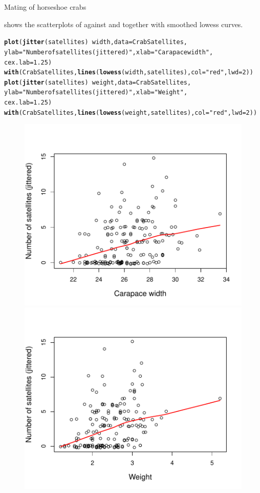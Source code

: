 \documentclass[11pt]{book}\usepackage[]{graphicx}\usepackage[]{color}
\makeatletter
\newcommand{\hlnum}[1]{\textcolor[rgb]{0.686,0.059,0.569}{#1}}%
\newcommand{\hlstr}[1]{\textcolor[rgb]{0.192,0.494,0.8}{#1}}%
\newcommand{\hlopt}[1]{\textcolor[rgb]{0,0,0}{#1}}%
\newcommand{\hlstd}[1]{\textcolor[rgb]{0.345,0.345,0.345}{#1}}%
\newcommand{\hlkwc}[1]{\textcolor[rgb]{0.333,0.667,0.333}{#1}}%
\newcommand{\hlkwd}[1]{\textcolor[rgb]{0.737,0.353,0.396}{\textbf{#1}}}%
\newenvironment{kframe}{%
 \def\at@end@of@kframe{}%
 \ifinner\ifhmode%
  \def\at@end@of@kframe{\end{minipage}}%
  \begin{minipage}{\columnwidth}%
 \fi\fi%
 \def\FrameCommand##1{\hskip\@totalleftmargin \hskip-\fboxsep
 \colorbox{shadecolor}{##1}\hskip-\fboxsep
     \hskip-\linewidth \hskip-\@totalleftmargin \hskip\columnwidth}%
 \MakeFramed {\advance\hsize-\width
   \@totalleftmargin\z@ \linewidth\hsize
   \@setminipage}}%
 {\par\unskip\endMakeFramed%
 \at@end@of@kframe}
\newenvironment{knitrout}{}{} %
\renewenvironment{knitrout}{\small\renewcommand{\baselinestretch}{.85}}{} %
\makeatother
\begin{document}
\begin{Example}[crabs1]{Mating of horseshoe crabs}
\begin{knitrout}
\end{knitrout}

 shows the scatterplots of  against  and 
together with smoothed lowess curves.
\begin{knitrout}
\color{fgcolor}\begin{kframe}
\begin{alltt}
\hlkwd{plot}\hlstd{(}\hlkwd{jitter}\hlstd{(satellites)} \hlopt{~} \hlstd{width,} \hlkwc{data}\hlstd{=CrabSatellites,}
  \hlkwc{ylab}\hlstd{=}\hlstr{"Number of satellites (jittered)"}\hlstd{,} \hlkwc{xlab}\hlstd{=}\hlstr{"Carapace width"}\hlstd{,}
  \hlkwc{cex.lab}\hlstd{=}\hlnum{1.25}\hlstd{)}
\hlkwd{with}\hlstd{(CrabSatellites,} \hlkwd{lines}\hlstd{(}\hlkwd{lowess}\hlstd{(width, satellites),} \hlkwc{col}\hlstd{=}\hlstr{"red"}\hlstd{,} \hlkwc{lwd}\hlstd{=}\hlnum{2}\hlstd{))}
\hlkwd{plot}\hlstd{(}\hlkwd{jitter}\hlstd{(satellites)} \hlopt{~} \hlstd{weight,} \hlkwc{data}\hlstd{=CrabSatellites,}
  \hlkwc{ylab}\hlstd{=}\hlstr{"Number of satellites (jittered)"}\hlstd{,} \hlkwc{xlab}\hlstd{=}\hlstr{"Weight"}\hlstd{,}
  \hlkwc{cex.lab}\hlstd{=}\hlnum{1.25}\hlstd{)}
\hlkwd{with}\hlstd{(CrabSatellites,} \hlkwd{lines}\hlstd{(}\hlkwd{lowess}\hlstd{(weight, satellites),} \hlkwc{col}\hlstd{=}\hlstr{"red"}\hlstd{,} \hlkwc{lwd}\hlstd{=}\hlnum{2}\hlstd{))}
\end{alltt}
\end{kframe}\begin{figure}[!htbp]

\centerline{\includegraphics[width=.49\textwidth]{ch09/fig/crabs1-scats-1} 
\includegraphics[width=.49\textwidth]{ch09/fig/crabs1-scats-2} }


\end{figure}
\end{knitrout}
\end{Example}
\end{document}
